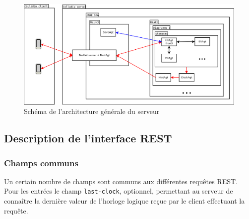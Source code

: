 \vspace*{\fill}
\begin{figure}[!h]
	\includegraphics[width=.9\textwidth]{img/general_server}
	\caption{Schéma de l'architecture générale du serveur}
\end{figure}

\subsection{Description de l'interface REST}
\subsubsection{Champs communs}
Un certain nombre de champs sont communs aux différentes requêtes REST.
Pour les entrées le champ \lstinline$last-clock$, optionnel, permettant au serveur de connaître la dernière valeur de l'horloge logique reçue par le client effectuant la requête.


